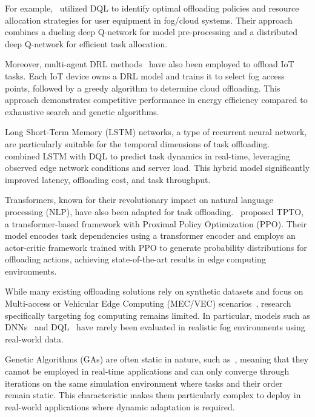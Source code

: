 \documentclass{svproc}
\begin{document}
For example,~\cite{jiang_reinforcement_2021} utilized DQL to identify optimal offloading policies and resource allocation strategies for user equipment in fog/cloud systems. Their approach combines a dueling deep Q-network for model pre-processing and a distributed deep Q-network for efficient task allocation.

Moreover, multi-agent DRL methods~\cite{ren_deep_2021} have also been employed to offload IoT tasks. Each IoT device owns a DRL model and trains it to select fog access points, followed by a greedy algorithm to determine cloud offloading. This approach demonstrates competitive performance in energy efficiency compared to exhaustive search and genetic algorithms.

Long Short-Term Memory (LSTM) networks, a type of recurrent neural network, are particularly suitable for the temporal dimensions of task offloading.~\cite{tu_task_2022} combined LSTM with DQL to predict task dynamics in real-time, leveraging observed edge network conditions and server load. This hybrid model significantly improved latency, offloading cost, and task throughput.

Transformers, known for their revolutionary impact on natural language processing (NLP), have also been adapted for task offloading.~\cite{gholipour_tpto_2023} proposed TPTO, a transformer-based framework with Proximal Policy Optimization (PPO). Their model encodes task dependencies using a transformer encoder and employs an actor-critic framework trained with PPO to generate probability distributions for offloading actions, achieving state-of-the-art results in edge computing environments.

While many existing offloading solutions rely on synthetic datasets and focus on Multi-access or Vehicular Edge Computing (MEC/VEC) scenarios~\cite{fahimullah_review_2022, tu_task_2022, gholipour_tpto_2023}, research specifically targeting fog computing remains limited. In particular, models such as DNNs~\cite{sarkar_deep_2022} and DQL~\cite{jiang_reinforcement_2021} have rarely been evaluated in realistic fog environments using real-world data.

Genetic Algorithms (GAs) are often static in nature, such as~\cite{bernard_d-npga_2024, pakmehr_etfc_2024}, meaning that they cannot be employed in real-time applications and can only converge through iterations on the same simulation environment where tasks and their order remain static. This characteristic makes them particularly complex to deploy in real-world applications where dynamic adaptation is required.
\end{document}
